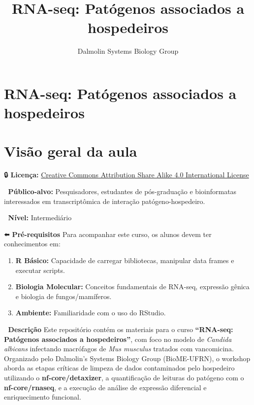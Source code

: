 \documentclass[
  letterpaper,
  DIV=11,
  numbers=noendperiod]{scrreprt}
\title{RNA-seq: Patógenos associados a hospedeiros}
\author{Dalmolin Systems Biology Group}
\date{}
\providecommand{\tightlist}{%
  \setlength{\itemsep}{0pt}\setlength{\parskip}{0pt}}
\renewcommand*\contentsname{Table of contents}
\newcommand\contentsname{Table of contents}
\begin{document}
\maketitle


\renewcommand*\contentsname{Table of contents}
{
\setcounter{tocdepth}{2}
\tableofcontents
}


\chapter{RNA-seq: Patógenos associados a
hospedeiros}\label{rna-seq-patuxf3genos-associados-a-hospedeiros}


\chapter{Visão geral da aula}\label{visuxe3o-geral-da-aula}

🔒 \textbf{Licença:}
\href{https://creativecommons.org/licenses/by-sa/4.0/deed.en}{Creative
Commons Attribution Share Alike 4.0 International License}

👥 \textbf{Público-alvo:} Pesquisadores, estudantes de pós-graduação e
bioinformatas interessados em transcriptômica de interação
patógeno-hospedeiro.

📶 \textbf{Nível:} Intermediário

⬅️ \textbf{Pré-requisitos} Para acompanhar este curso, os alunos devem
ter conhecimentos em:

\begin{enumerate}
\def\labelenumi{\arabic{enumi}.}
\tightlist
\item
  \textbf{R Básico:} Capacidade de carregar bibliotecas, manipular data
  frames e executar scripts.
\item
  \textbf{Biologia Molecular:} Conceitos fundamentais de RNA-seq,
  expressão gênica e biologia de fungos/mamíferos.
\item
  \textbf{Ambiente:} Familiaridade com o uso do RStudio.
\end{enumerate}

📖 \textbf{Descrição} Este repositório contém os materiais para o curso
\textbf{``RNA-seq: Patógenos associados a hospedeiros''}, com foco no
modelo de \emph{Candida albicans} infectando macrófagos de \emph{Mus
musculus} tratados com vancomicina. Organizado pelo Dalmolin's Systems
Biology Group (BioME-UFRN), o workshop aborda as etapas críticas de
limpeza de dados contaminados pelo hospedeiro utilizando o
\textbf{nf-core/detaxizer}, a quantificação de leituras do patógeno com
o \textbf{nf-core/rnaseq}, e a execução de análise de expressão
diferencial e enriquecimento funcional.
\end{document}
